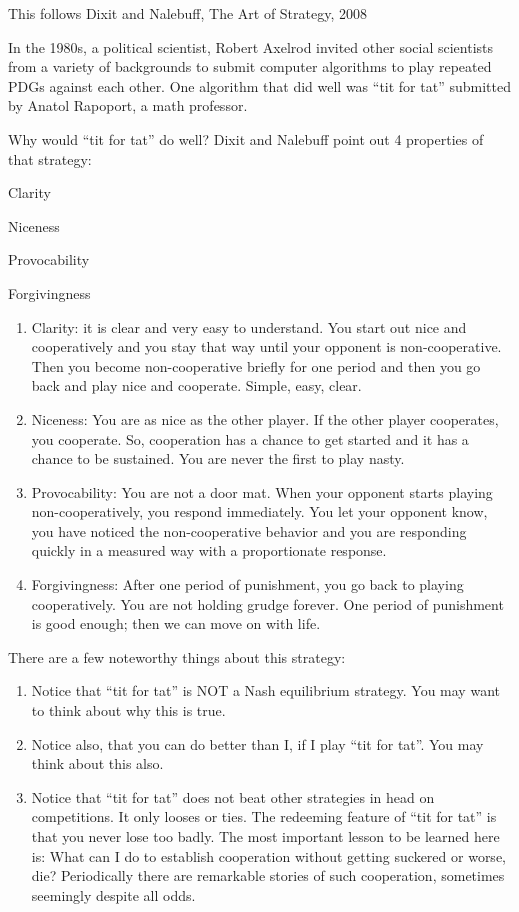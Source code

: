 \documentclass[
]{book}
\providecommand{\tightlist}{%
  \setlength{\itemsep}{0pt}\setlength{\parskip}{0pt}}
\begin{document}
This follows Dixit and Nalebuff, The Art of Strategy, 2008

In the 1980s, a political scientist, Robert Axelrod invited other social scientists from a variety of backgrounds to submit computer algorithms to play repeated PDGs against each other. One algorithm that did well was ``tit for tat'' submitted by Anatol Rapoport, a math professor.

Why would ``tit for tat'' do well? Dixit and Nalebuff point out 4 properties of that strategy:

\begin{center}
Clarity

Niceness

Provocability

Forgivingness

\end{center}

\begin{enumerate}
\def\labelenumi{\arabic{enumi}.}
\tightlist
\item
  Clarity: it is clear and very easy to understand. You start out nice and cooperatively and you stay that way until your opponent is non-cooperative. Then you become non-cooperative briefly for one period and then you go back and play nice and cooperate. Simple, easy, clear.\\
\item
  Niceness: You are as nice as the other player. If the other player cooperates, you cooperate. So, cooperation has a chance to get started and it has a chance to be sustained. You are never the first to play nasty.
\item
  Provocability: You are not a door mat. When your opponent starts playing non-cooperatively, you respond immediately. You let your opponent know, you have noticed the non-cooperative behavior and you are responding quickly in a measured way with a proportionate response.
\item
  Forgivingness: After one period of punishment, you go back to playing cooperatively. You are not holding grudge forever. One period of punishment is good enough; then we can move on with life.
\end{enumerate}

There are a few noteworthy things about this strategy:

\begin{enumerate}
\def\labelenumi{\arabic{enumi}.}
\tightlist
\item
  Notice that ``tit for tat'' is NOT a Nash equilibrium strategy. You may want to think about why this is true.
\item
  Notice also, that you can do better than I, if I play ``tit for tat''. You may think about this also.
\item
  Notice that ``tit for tat'' does not beat other strategies in head on competitions. It only looses or ties. The redeeming feature of ``tit for tat'' is that you never lose too badly.
  The most important lesson to be learned here is:
  What can I do to establish cooperation without getting suckered or worse, die?
  Periodically there are remarkable stories of such cooperation, sometimes seemingly despite all odds.
\end{enumerate}
\end{document}
